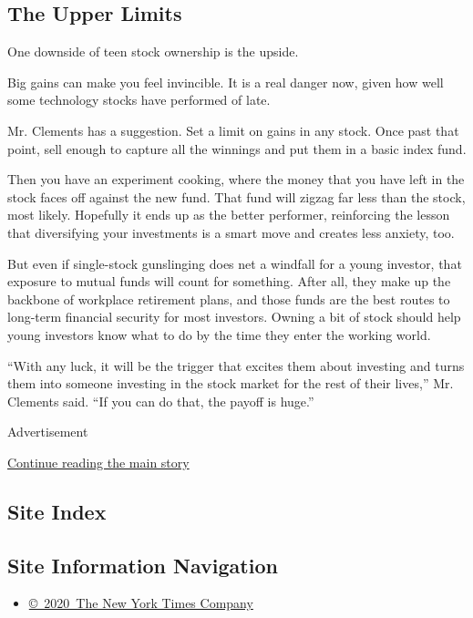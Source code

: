\hypertarget{the-upper-limits}{%
\subsection{The Upper Limits}\label{the-upper-limits}}

One downside of teen stock ownership is the upside.

Big gains can make you feel invincible. It is a real danger now, given
how well some technology stocks have performed of late.

Mr. Clements has a suggestion. Set a limit on gains in any stock. Once
past that point, sell enough to capture all the winnings and put them in
a basic index fund.

Then you have an experiment cooking, where the money that you have left
in the stock faces off against the new fund. That fund will zigzag far
less than the stock, most likely. Hopefully it ends up as the better
performer, reinforcing the lesson that diversifying your investments is
a smart move and creates less anxiety, too.

But even if single-stock gunslinging does net a windfall for a young
investor, that exposure to mutual funds will count for something. After
all, they make up the backbone of workplace retirement plans, and those
funds are the best routes to long-term financial security for most
investors. Owning a bit of stock should help young investors know what
to do by the time they enter the working world.

``With any luck, it will be the trigger that excites them about
investing and turns them into someone investing in the stock market for
the rest of their lives,'' Mr. Clements said. ``If you can do that, the
payoff is huge.''

Advertisement

\protect\hyperlink{after-bottom}{Continue reading the main story}

\hypertarget{site-index}{%
\subsection{Site Index}\label{site-index}}

\hypertarget{site-information-navigation}{%
\subsection{Site Information
Navigation}\label{site-information-navigation}}

\begin{itemize}
\tightlist
\item
  \href{https://help.nytimes3xbfgragh.onion/hc/en-us/articles/115014792127-Copyright-notice}{©~2020~The
  New York Times Company}
\end{itemize}

